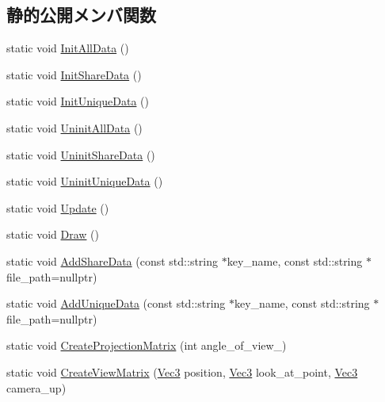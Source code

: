 \subsection*{静的公開メンバ関数}
\begin{DoxyCompactItemize}
\item 
static void \mbox{\hyperlink{class_effekseer_manager_ac5744fba29048e417bf46a8fbf5a8e76}{Init\+All\+Data}} ()
\item 
static void \mbox{\hyperlink{class_effekseer_manager_a881d9bdd981c35de66174363517050b4}{Init\+Share\+Data}} ()
\item 
static void \mbox{\hyperlink{class_effekseer_manager_a95d9d2eda8cb691c2565d022198b5787}{Init\+Unique\+Data}} ()
\item 
static void \mbox{\hyperlink{class_effekseer_manager_aa9f5c911182097238d979cc628f2dc13}{Uninit\+All\+Data}} ()
\item 
static void \mbox{\hyperlink{class_effekseer_manager_ab83021d09eeeaba41852c8db2f07fe55}{Uninit\+Share\+Data}} ()
\item 
static void \mbox{\hyperlink{class_effekseer_manager_abd448f6ec39f2306a6dc99b79aff0362}{Uninit\+Unique\+Data}} ()
\item 
static void \mbox{\hyperlink{class_effekseer_manager_a2278033d786e1ada0fcaa390a613a8f9}{Update}} ()
\item 
static void \mbox{\hyperlink{class_effekseer_manager_a0c9155e72b0552e5138e68be682a63a4}{Draw}} ()
\item 
static void \mbox{\hyperlink{class_effekseer_manager_aec98cb9052d849cae3f9cfee80c4c873}{Add\+Share\+Data}} (const std\+::string $\ast$key\+\_\+name, const std\+::string $\ast$file\+\_\+path=nullptr)
\item 
static void \mbox{\hyperlink{class_effekseer_manager_ad89f0ad2a840f191c088d35ddfd2ec62}{Add\+Unique\+Data}} (const std\+::string $\ast$key\+\_\+name, const std\+::string $\ast$file\+\_\+path=nullptr)
\item 
static void \mbox{\hyperlink{class_effekseer_manager_ae4faa1c46f9b4a372559567748df2384}{Create\+Projection\+Matrix}} (int angle\+\_\+of\+\_\+view\+\_\+)
\item 
static void \mbox{\hyperlink{class_effekseer_manager_ad36867f996af58d4b788a17cf25244a7}{Create\+View\+Matrix}} (\mbox{\hyperlink{_vector3_d_8h_ab16f59e4393f29a01ec8b9bbbabbe65d}{Vec3}} position, \mbox{\hyperlink{_vector3_d_8h_ab16f59e4393f29a01ec8b9bbbabbe65d}{Vec3}} look\+\_\+at\+\_\+point, \mbox{\hyperlink{_vector3_d_8h_ab16f59e4393f29a01ec8b9bbbabbe65d}{Vec3}} camera\+\_\+up)

\end{DoxyCompactItemize}

